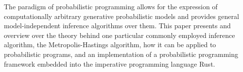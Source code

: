 The paradigm of probabilistic programming allows for the expression of computationally arbitrary generative probabilistic models and provides general model-independent inference algorithms over them. This paper presents and overview over the theory behind one particular commonly employed inference algorithm, the Metropolis-Hastings algorithm, how it can be applied to probabilistic programs, and an implementation of a probabilistic programming framework embedded into the imperative programming language Rust.